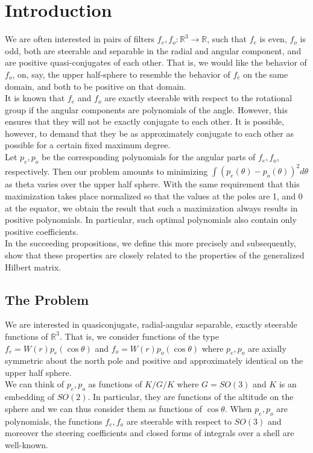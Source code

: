 \documentclass[11pt]{article}
\theoremstyle{definition}
\theoremstyle{remark}
\numberwithin{equation}{section}
\begin{document}
\section{Introduction}\label{Introduction}
We are often interested in pairs of filters $f_e, f_o: \mathbb{R}^3 \to \mathbb{R}$,  such that $f_e$ is even, $f_o$ is odd, both are steerable and separable in the radial and angular component, and are positive quasi-conjugates of each other. That is, we would like the behavior of $f_o$, on, say, the upper half-sphere to resemble the behavior of $f_e$ on the same domain, and both to be positive on that domain. \\

It is known that $f_e$ and $f_o$ are exactly steerable with respect to the rotational group if the angular components are polynomials of the angle. However, this ensures that they will not be exactly conjugate to each other. It is possible, however, to demand that they be as approximately conjugate to each other as possible for a certain fixed maximum degree. \\ 

Let $p_e, p_o$ be the corresponding polynomials for the angular parts of $f_e, f_o$, respectively. Then our problem amounts to minimizing $\int (p_e(\theta) - p_o(\theta))^2d\theta$ as theta varies over the upper half sphere. With the same requirement that this maximization takes place normalized so that the values at the poles are 1, and 0 at the equator, we obtain the result that such a maximization always results in positive polynomials. In particular, such optimal polynomials also contain only positive coefficients. \\

In the succeeding propositions, we define this more precisely and subsequently, show that these properties are closely related to the properties of the generalized Hilbert matrix. 

\subsection{The Problem}
We are interested in quasiconjugate, radial-angular separable, exactly steerable functions of $\mathbb{R}^3$. That is, we consider functions of the type $f_e = W(r)p_e(\cos \theta)$ and $f_o = W(r)p_o(\cos \theta)$ where $p_e, p_o$ are axially symmetric about the north pole and positive and approximately identical on the upper half sphere. \\

We can think of $p_e, p_o$ as functions of $K/G/K$ where $G=SO(3)$ and $K$ is an embedding of $SO(2)$. In particular, they are functions of the altitude on the sphere and we can thus consider them as functions of $\cos \theta$. When $p_e, p_o$ are polynomials, the functions $f_e, f_o$ are steerable with respect to $SO(3)$ and moreover the steering coefficients and closed forms of integrals over a shell are well-known. \\
\end{document}
